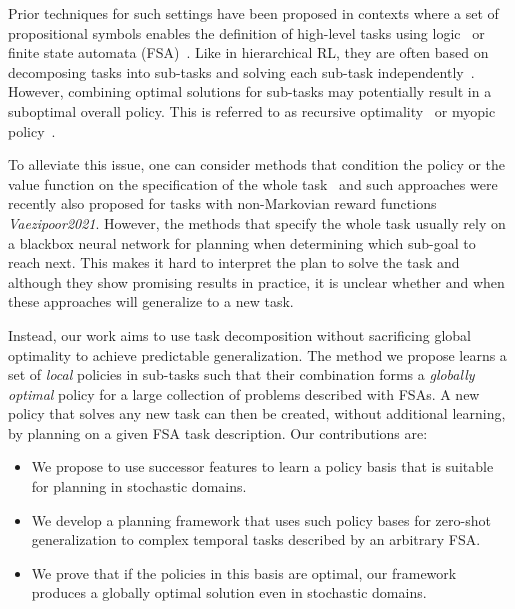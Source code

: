 Prior techniques for such settings have been proposed in contexts where a set of propositional symbols enables the definition of high-level tasks using logic~\citep{Vaezipoor2021, ToroIcarte2019}
or finite state automata (FSA)~\citep{Icarte2022}. Like in hierarchical RL,
they are often based on decomposing tasks into sub-tasks and solving each sub-task independently~\citep{Dietterich2000, Sutton1999}. 
However, combining optimal solutions for sub-tasks may potentially result in a suboptimal overall policy. 
This is referred to as recursive optimality~\citep{Dietterich2000} or myopic policy~\citep{Vaezipoor2021}. 

To alleviate this issue, one can consider methods that condition the policy or the value function on the specification of the whole task~\citep{UVF} and such approaches were recently also proposed for tasks with non-Markovian reward functions \textit{Vaezipoor2021}. However, the methods that specify the whole task usually rely on a blackbox neural network for planning when determining which sub-goal to reach next. This makes it hard to interpret the plan to solve the task and although  they show promising results in practice, %
it is unclear whether and when these approaches will generalize to a new task.


Instead, our work aims to use task decomposition without sacrificing global optimality to achieve predictable generalization. The method we propose learns a set of \textit{local} policies in sub-tasks such that their combination forms a \textit{globally optimal} policy for a large collection of problems described with FSAs. A new policy that solves any new task can then be created, without additional learning, by planning on a given FSA task description. Our contributions are:
 \begin{itemize}
    \item We propose to use successor features to learn a policy basis that is suitable for planning in stochastic domains.
    \item We develop a planning framework that uses such policy bases for zero-shot generalization to complex temporal tasks described by an arbitrary FSA.
    \item We prove that if the policies in this basis are optimal, our framework produces a globally optimal solution even in stochastic domains.
\end{itemize}



